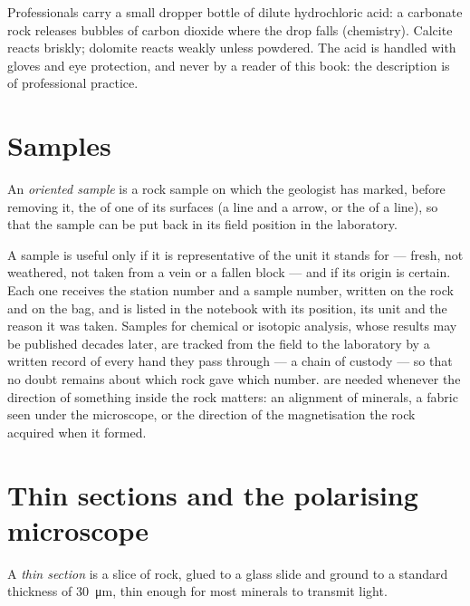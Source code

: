 Professionals carry a small dropper bottle of dilute hydrochloric acid: a
carbonate rock releases bubbles of carbon dioxide where the drop falls
(chemistry). Calcite reacts briskly; dolomite reacts weakly unless powdered.
The acid is handled with gloves and eye protection, and never by a reader of
this book: the description is of professional practice.

\section{Samples}

\begin{definition}\label{def:b1:field-lab-methods-1:sample}
An \emph{oriented sample} is a rock sample on which the
geologist has marked, before removing it, the  of one of its surfaces
(a  line and a  arrow, or the  of a line), so that the sample
can be put back in its field position in the laboratory.
\end{definition}

A sample is useful only if it is representative of the unit it stands for ---
fresh, not weathered, not taken from a vein or a fallen block --- and if its
origin is certain. Each one receives the station number and a sample number,
written on the rock and on the bag, and is listed in the notebook with its
position, its unit and the reason it was taken. Samples for chemical or
isotopic analysis, whose results may be published decades later, are tracked
from the field to the laboratory by a written record of every hand they pass
through --- a chain of custody --- so that no doubt remains about which rock
gave which number.  are needed whenever the direction of
something inside the rock matters: an alignment of minerals, a fabric seen
under the microscope, or the direction of the magnetisation the rock
acquired when it formed.

\section{Thin sections and the polarising microscope}

\begin{definition}\label{def:b1:field-lab-methods-1:thin-section}
A \emph{thin section} is a slice of rock, glued to a
glass slide and ground to a standard thickness of \qty{30}{\micro\metre}, thin
enough for most minerals to transmit light.
\end{definition}

